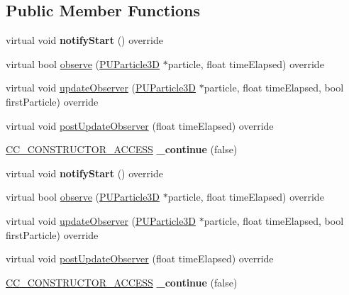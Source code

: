 \subsection*{Public Member Functions}
\begin{DoxyCompactItemize}
\item 
\mbox{\label{classPUOnClearObserver_afbec1fd9185cdd01b09a6fcfa09fb3a4}} 
virtual void {\bfseries notify\+Start} () override
\item 
virtual bool \hyperlink{classPUOnClearObserver_a63170ff694bf58c730d63145129b0dc0}{observe} (\hyperlink{structPUParticle3D}{P\+U\+Particle3D} $\ast$particle, float time\+Elapsed) override
\item 
virtual void \hyperlink{classPUOnClearObserver_ab17df4b87cd37d6019e69a00e621a45f}{update\+Observer} (\hyperlink{structPUParticle3D}{P\+U\+Particle3D} $\ast$particle, float time\+Elapsed, bool first\+Particle) override
\item 
virtual void \hyperlink{classPUOnClearObserver_ac6970028b94d011a9b3d1aa3b971acf5}{post\+Update\+Observer} (float time\+Elapsed) override
\item 
\mbox{\label{classPUOnClearObserver_acb0a1394834fbe5f2ae0c339bfdd330d}} 
\hyperlink{_2cocos2d_2cocos_2base_2ccConfig_8h_a25ef1314f97c35a2ed3d029b0ead6da0}{C\+C\+\_\+\+C\+O\+N\+S\+T\+R\+U\+C\+T\+O\+R\+\_\+\+A\+C\+C\+E\+SS} {\bfseries \+\_\+continue} (false)
\item 
\mbox{\label{classPUOnClearObserver_a97216d13a5964fae1f9b144f651b6224}} 
virtual void {\bfseries notify\+Start} () override
\item 
virtual bool \hyperlink{classPUOnClearObserver_ac6c19fab71428b5c01df6e39955fa7fd}{observe} (\hyperlink{structPUParticle3D}{P\+U\+Particle3D} $\ast$particle, float time\+Elapsed) override
\item 
virtual void \hyperlink{classPUOnClearObserver_a6f369e4a21ee9a2f2ce546af9e971a43}{update\+Observer} (\hyperlink{structPUParticle3D}{P\+U\+Particle3D} $\ast$particle, float time\+Elapsed, bool first\+Particle) override
\item 
virtual void \hyperlink{classPUOnClearObserver_a4dc534248eaa6d68828a47d4fec0f0e5}{post\+Update\+Observer} (float time\+Elapsed) override
\item 
\mbox{\label{classPUOnClearObserver_acb0a1394834fbe5f2ae0c339bfdd330d}} 
\hyperlink{_2cocos2d_2cocos_2base_2ccConfig_8h_a25ef1314f97c35a2ed3d029b0ead6da0}{C\+C\+\_\+\+C\+O\+N\+S\+T\+R\+U\+C\+T\+O\+R\+\_\+\+A\+C\+C\+E\+SS} {\bfseries \+\_\+continue} (false)
\end{DoxyCompactItemize}
